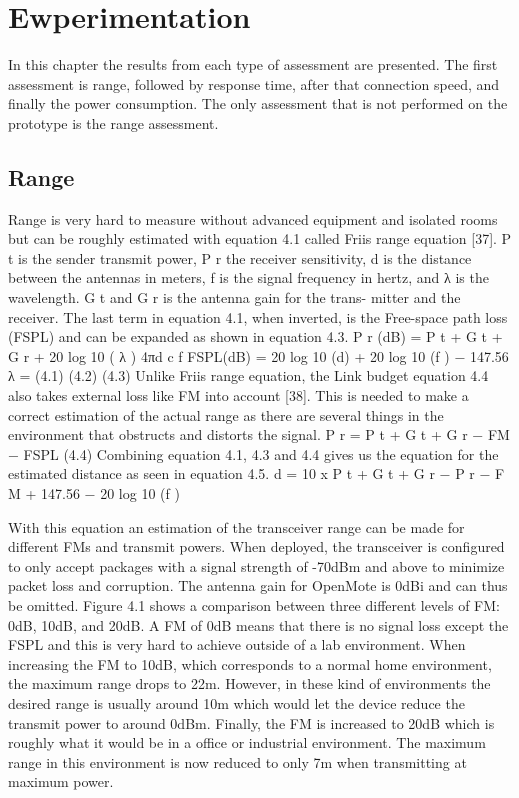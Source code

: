 \section{Ewperimentation}

In this chapter the results from each type of assessment are presented.
The first assessment is range,
	followed by response time,
	after that connection speed,
	and finally the power consumption.
The only assessment that is not performed on the prototype is the range assessment.

\subsection{Range}
Range is very hard to measure without advanced equipment and isolated
rooms but can be roughly estimated with equation 4.1 called Friis range
equation [37]. P t is the sender transmit power, P r the receiver sensitivity, d
is the distance between the antennas in meters, f is the signal frequency in
hertz, and λ is the wavelength. G t and G r is the antenna gain for the trans-
mitter and the receiver. The last term in equation 4.1, when inverted, is the
Free-space path loss (FSPL) and can be expanded as shown in equation 4.3.
P r (dB) = P t + G t + G r + 20 log 10 (
λ
)
4πd
c
f
FSPL(dB) = 20 log 10 (d) + 20 log 10 (f ) − 147.56
λ =
(4.1)
(4.2)
(4.3)
Unlike Friis range equation, the Link budget equation 4.4 also takes external
loss like FM into account [38]. This is needed to make a correct estimation of
the actual range as there are several things in the environment that obstructs
and distorts the signal.
P r = P t + G t + G r − FM − FSPL
(4.4)
Combining equation 4.1, 4.3 and 4.4 gives us the equation for the estimated
distance as seen in equation 4.5.
d = 10 x
P t + G t + G r − P r − F M + 147.56 − 20 log 10 (f )


With this equation an estimation of the transceiver range can be made for different FMs and transmit powers.
When deployed,
	the transceiver is configured to only accept packages with a signal strength of -70dBm and above to minimize packet loss and corruption.
The antenna gain for OpenMote is 0dBi and can thus be omitted.
Figure 4.1 shows a comparison between three different levels of FM: 0dB, 10dB,
	and 20dB.
A FM of 0dB means that there is no signal loss except the FSPL and this is very hard to achieve outside of a lab environment.
When increasing the FM to 10dB,
	which corresponds to a normal home environment,
	the maximum range drops to 22m.
However,
	in these kind of environments the desired range is usually around 10m which would let the device reduce the transmit power to around 0dBm.
Finally,
	the FM is increased to 20dB which is roughly what it would be in a office or industrial environment.
The maximum range in this environment is now reduced to only 7m when transmitting at maximum power.

